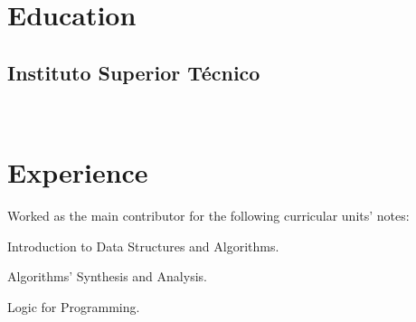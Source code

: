\documentclass[]{deedy-resume-openfont}
\begin{document}
\hfill
\begin{minipage}[t]{0.66\textwidth} 


\section{Education} 

\subsection{Instituto Superior Técnico}
\sectionsep

 \\
\sectionsep


\section{Experience}

Worked as the main contributor for the following curricular units' notes:
\vspace{\topsep} %
\begin{tightemize}
\item Introduction to Data Structures and Algorithms.
\item Algorithms' Synthesis and Analysis.
\item Logic for Programming.
\end{tightemize}

\sectionsep

\end{minipage} 
\end{document}

